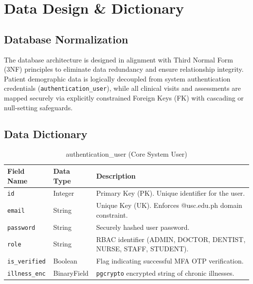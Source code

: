 \section{Data Design \& Dictionary}

\subsection{Database Normalization}
The database architecture is designed in alignment with Third Normal Form (3NF) principles to eliminate data redundancy and ensure relationship integrity. Patient demographic data is logically decoupled from system authentication credentials (\texttt{authentication\_user}), while all clinical visits and assessments are mapped securely via explicitly constrained Foreign Keys (FK) with cascading or null-setting safeguards.

\subsection{Data Dictionary}

\begin{table}[htbp]
\centering
\caption{authentication\_user (Core System User)}
\begin{tabular}{|l|l|p{7cm}|}
\hline
\textbf{Field Name} & \textbf{Data Type} & \textbf{Description} \\
\hline
\texttt{id} & Integer & Primary Key (PK). Unique identifier for the user. \\
\hline
\texttt{email} & String & Unique Key (UK). Enforces @usc.edu.ph domain constraint. \\
\hline
\texttt{password} & String & Securely hashed user password. \\
\hline
\texttt{role} & String & RBAC identifier (ADMIN, DOCTOR, DENTIST, NURSE, STAFF, STUDENT). \\
\hline
\texttt{is\_verified} & Boolean & Flag indicating successful MFA OTP verification. \\
\hline
\texttt{illness\_enc} & BinaryField & \texttt{pgcrypto} encrypted string of chronic illnesses. \\
\hline
\end{tabular}
\end{table}

